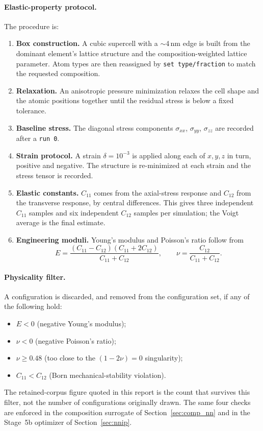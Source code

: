 \paragraph{Elastic-property protocol.}
The procedure is:
\begin{enumerate}
	\item \textbf{Box construction.} A cubic supercell with a $\sim$4\,nm edge is
	      built from the dominant element's lattice structure and the
	      composition-weighted lattice parameter. Atom types are then reassigned
	      by \texttt{set type/fraction} to match the requested composition.
	\item \textbf{Relaxation.} An anisotropic pressure minimization relaxes the
	      cell shape and the atomic positions together until the residual stress
	      is below a fixed tolerance.
	\item \textbf{Baseline stress.} The diagonal stress components
	      $\sigma_{xx}$, $\sigma_{yy}$, $\sigma_{zz}$ are recorded after a
	      \texttt{run~0}.
	\item \textbf{Strain protocol.} A strain $\delta=10^{-3}$ is applied along
	      each of $x,y,z$ in turn, positive and negative. The structure is
	      re-minimized at each strain and the stress tensor is recorded.
	\item \textbf{Elastic constants.} $C_{11}$ comes from the axial-stress
	      response and $C_{12}$ from the transverse response, by central
	      differences. This gives three independent $C_{11}$ samples and six
	      independent $C_{12}$ samples per simulation; the Voigt average
	      \citep{voigt} is the final estimate.
	\item \textbf{Engineering moduli.} Young's modulus and Poisson's ratio
	      follow from
	      \begin{equation}
	      	E = \frac{(C_{11}-C_{12})(C_{11}+2C_{12})}{C_{11}+C_{12}},
	      	\qquad
	      	\nu = \frac{C_{12}}{C_{11}+C_{12}}.
	      	\label{eq:elastic}
	      \end{equation}
\end{enumerate}

\paragraph{Physicality filter.}
A configuration is discarded, and removed from the configuration set, if any of
the following hold:
\begin{itemize}
	\item $E < 0$ (negative Young's modulus);
	\item $\nu < 0$ (negative Poisson's ratio);
	\item $\nu \geq 0.48$ (too close to the $(1-2\nu)=0$ singularity);
	\item $C_{11} < C_{12}$ (Born mechanical-stability violation).
\end{itemize}
The retained-corpus figure quoted in this report is the count that survives
this filter, not the number of configurations originally drawn. The same four
checks are enforced in the composition surrogate of Section~\ref{sec:comp_nn}
and in the Stage~5b optimizer of Section~\ref{sec:nnip}.

